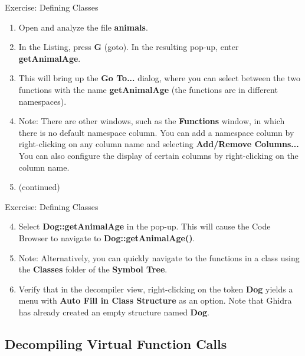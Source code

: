 \documentclass{beamer}
\begin{document}
\begin{frame}
\begin{block}{Exercise: Defining Classes}
\begin{enumerate}
\item Open and analyze the file \textbf{animals}.
\item In the Listing, press \textbf{G} (goto).  In the resulting pop-up, enter \textbf{getAnimalAge}.  \item This will bring up the \textbf{Go To...} dialog, where you can 
select between the two functions with the name \textbf{getAnimalAge} (the functions are in different namespaces).
\item[] Note: There are other windows, such as the \textbf{Functions} window, in which there is no default namespace column.  You can add a namespace column by right-clicking 
on any column name and selecting \textbf{Add/Remove Columns...}  You can also configure the display of certain columns by right-clicking on the column name.
\item[] (continued)
\end{enumerate}
\end{block}
\end{frame}

\begin{frame}
\begin{block}{Exercise: Defining Classes}
\begin{enumerate}
\setcounter{enumi}{3}
\item Select \textbf{Dog::getAnimalAge} in the pop-up. This will cause the Code Browser to navigate to \textbf{Dog::getAnimalAge()}.
\item[] Note: Alternatively, you can quickly navigate to the functions in a class using the \textbf{Classes} folder of the \textbf{Symbol Tree}.
\item Verify that in the decompiler view, right-clicking on the token \textbf{Dog} yields a menu with \textbf{Auto Fill in Class Structure} as an option.  
Note that Ghidra has already created an empty structure named \textbf{Dog}.
\end{enumerate}
\end{block}
\end{frame}

\subsection{Decompiling Virtual Function Calls}
\end{document}
